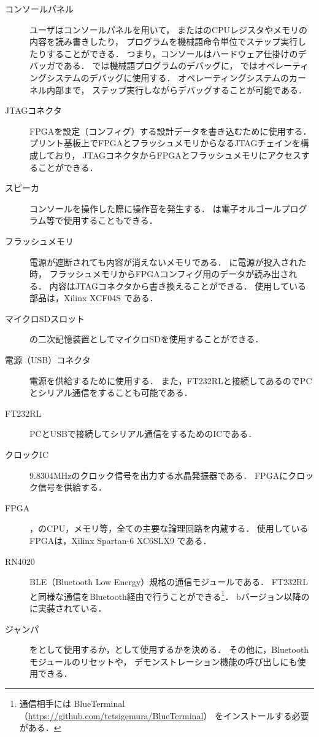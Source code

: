 \begin{description}
\item[コンソールパネル]
  ユーザはコンソールパネルを用いて，
  {\tec}または{\tac}のCPUレジスタやメモリの内容を読み書きしたり，
  プログラムを機械語命令単位でステップ実行したりすることができる．
  つまり，コンソールはハードウェア仕掛けのデバッガである．
  {\tec}では機械語プログラムのデバッグに，
  {\tac}ではオペレーティングシステムのデバッグに使用する．
  オペレーティングシステムのカーネル内部まで，
  ステップ実行しながらデバッグすることが可能である．
\item[JTAGコネクタ]
  FPGAを設定（コンフィグ）する設計データを書き込むために使用する．
  プリント基板上でFPGAとフラッシュメモリからなるJTAGチェインを構成しており，
  JTAGコネクタからFPGAとフラッシュメモリにアクセスすることができる．
\item[スピーカ]
  コンソールを操作した際に操作音を発生する．
  {\tec}は電子オルゴールプログラム等で使用することもできる．
\item[フラッシュメモリ]
  電源が遮断されても内容が消えないメモリである．
  {\tecS}に電源が投入された時，
  フラッシュメモリからFPGAコンフィグ用のデータが読み出される．
  内容はJTAGコネクタから書き換えることができる．
  使用している部品は，Xilinx XCF04S である．
\item[マイクロSDスロット]
  {\tac}の二次記憶装置としてマイクロSDを使用することができる．
\item[電源（USB）コネクタ]
  電源を供給するために使用する．
  また，FT232RLと接続してあるのでPCとシリアル通信をすることも可能である．
\item[FT232RL]
  PCとUSBで接続してシリアル通信をするためのICである．
\item[クロックIC]
  9.8304MHzのクロック信号を出力する水晶発振器である．
  FPGAにクロック信号を供給する．
\item[FPGA]
  {\tec}，{\tac}のCPU，メモリ等，全ての主要な論理回路を内蔵する．
  使用しているFPGAは，Xilinx Spartan-6 XC6SLX9 である．
\item[RN4020]
  BLE（Bluetooth Low Energy）規格の通信モジュールである．
  FT232RLと同様な通信をBluetooth経由で行うことができる\footnote{
    通信相手には
    BlueTerminal（\url{https://github.com/tctsigemura/BlueTerminal}）
    をインストールする必要がある．}．
  bバージョン以降の{\tecS}に実装されている．
\item[ジャンパ]
  {\tecS}を{\tec}として使用するか，{\tac}として使用するかを決める．
  その他に，Bluetoothモジュールのリセットや，
  デモンストレーション機能の呼び出しにも使用できる．
\end{description}

